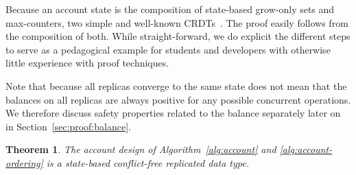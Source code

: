 \documentclass[9pt, oneside]{article}   	%
\newtheorem{theorem}{Theorem}
\begin{document}
Because an account state is the composition of state-based grow-only sets and max-counters, two simple and well-known CRDTs~\cite{shapiro:inria-00555588}. The proof easily follows from the composition of both. While straight-forward, we do explicit the different steps to serve as a pedagogical example for students and developers with otherwise little experience with proof techniques.

Note that because all replicas converge to the same state does not mean that the balances on all replicas are always positive for any possible concurrent operations. We therefore discuss safety properties related to the balance separately later on in Section~\ref{sec:proof:balance}.

\begin{theorem}
\label{th:account-crdt}
The account design of Algorithm~\ref{alg:account} and \ref{alg:account-ordering} is a state-based  conflict-free replicated data type.
\end{theorem}
\end{document}
